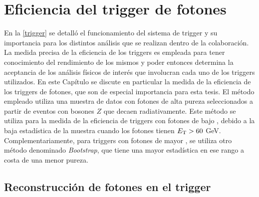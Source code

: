 \chapter{Eficiencia del trigger de fotones}



En la \autoref{trigger} se detalló el funcionamiento del sistema de trigger y su importancia para los distintos análisis que se realizan dentro de la colaboración. La medida precisa de la eficiencia de los triggers es empleada para tener conocimiento del rendimiento de los mismos y poder entonces determina la aceptancia de los análisis físicos de interés que involucran cada uno de los triggers utilizados. 
En este Capítulo se discute en particular la medida de la eficiencia de los triggers de fotones, que son de especial importancia para esta tesis. El método empleado utiliza una muestra de datos con fotones de alta pureza seleccionados a partir de eventos con bosones $Z$ que decaen radiativamente. Este método se utiliza para la medida de la eficiencia de triggers con fotones de bajo \ET, debido a la baja estadística de la muestra cuando los fotones tienen $E_{\text{T}}>60$ GeV. Complementariamente, para triggers con fotones de mayor \ET, se utiliza otro método denominado \textit{Bootstrap}, que tiene una mayor estadística en ese rango a costa de una menor pureza. 


\section{Reconstrucción de fotones en el trigger}

